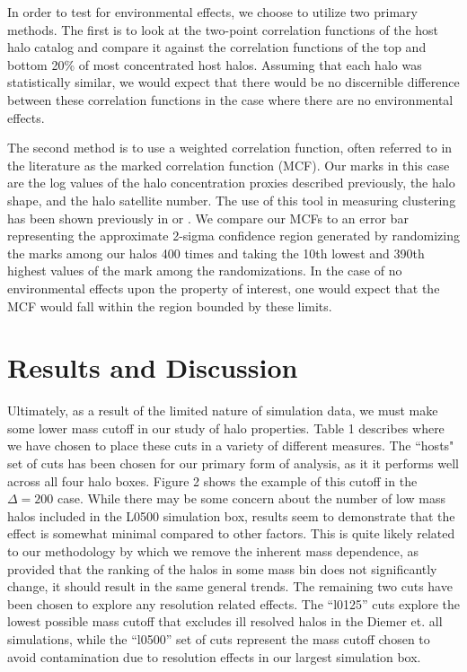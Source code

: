 \documentclass[usenatbib,usegraphicx,letterpaper]{mn2e}
\begin{document}
In order to test for environmental effects, we choose to utilize two primary methods. The first is to look at the two-point correlation functions of the host halo catalog and compare it against the correlation functions of the top and bottom 20\% of most concentrated host halos. Assuming that each halo was statistically similar, we would expect that there would be no discernible difference between these correlation functions in the case where there are no environmental effects.

The second method is to use a weighted correlation function, often referred to in the literature as the marked correlation function (MCF). Our marks in this case are the log values of the halo concentration proxies described previously, the halo shape, and the halo satellite number. The use of this tool in measuring clustering has been shown previously in \citet{wechsler06} or \citet{harker06}. We compare our MCFs to an error bar representing the approximate 2-sigma confidence region generated by randomizing the marks among our halos 400 times and taking the 10th lowest and 390th highest values of the mark among the randomizations. In the case of no environmental effects upon the property of interest, one would expect that the MCF would fall within the region bounded by these limits.

\section[]{Results and Discussion}
\label{section:results}

Ultimately, as a result of the limited nature of simulation data, we must make some lower mass cutoff in our study of halo properties. Table 1 describes where we have chosen to place these cuts in a variety of different measures. The ``hosts" set of cuts has been chosen for our primary form of analysis, as it it performs well across all four halo boxes. Figure 2 shows the example of this cutoff in the $\Delta = 200$ case. While there may be some concern about the number of low mass halos included in the L0500 simulation box, results seem to demonstrate that the effect is somewhat minimal compared to other factors. This is quite likely related to our methodology by which we remove the inherent mass dependence, as provided that the ranking of the halos in some mass bin does not significantly change, it should result in the same general trends. The remaining two cuts have been chosen to explore any resolution related effects. The ``l0125'' cuts explore the lowest possible mass cutoff that excludes ill resolved halos in the Diemer et. all simulations, while the ``l0500'' set of cuts represent the mass cutoff chosen to avoid contamination due to resolution effects in our largest simulation box.
\end{document}
